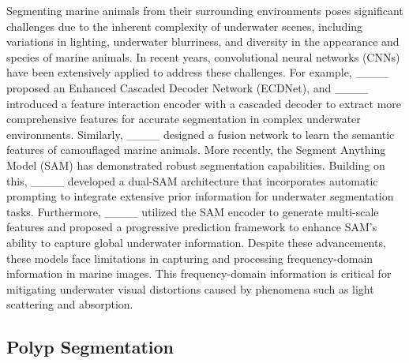 Segmenting marine animals from their surrounding environments poses significant challenges due to the inherent complexity of underwater scenes, including variations in lighting, underwater blurriness, and diversity in the appearance and species of marine animals. In recent years, convolutional neural networks (CNNs) have been extensively applied to address these challenges. For example, ____ proposed an Enhanced Cascaded Decoder Network (ECDNet), and ____ introduced a feature interaction encoder with a cascaded decoder to extract more comprehensive features for accurate segmentation in complex underwater environments. Similarly, ____ designed a fusion network to learn the semantic features of camouflaged marine animals.
More recently, the Segment Anything Model (SAM) has demonstrated robust segmentation capabilities. Building on this, ____ developed a dual-SAM architecture that incorporates automatic prompting to integrate extensive prior information for underwater segmentation tasks. Furthermore, ____ utilized the SAM encoder to generate multi-scale features and proposed a progressive prediction framework to enhance SAM’s ability to capture global underwater information.
Despite these advancements, these models face limitations in capturing and processing frequency-domain information in marine images. This frequency-domain information is critical for mitigating underwater visual distortions caused by phenomena such as light scattering and absorption.

\subsection{Polyp Segmentation}


